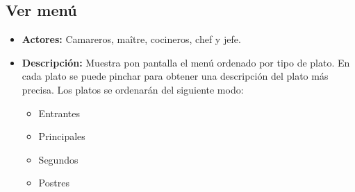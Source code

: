 \documentclass[spanish,a4paper,12pt]{report}	%
\begin{document}
 	
	\subsection{Ver menú}
			\begin{itemize}
			\item \textbf{Actores:} Camareros, maître, cocineros, chef y jefe.
			\item \textbf{Descripción:} Muestra pon pantalla el menú ordenado por tipo de plato. En cada plato se puede pinchar para obtener una descripción del plato más precisa. Los platos se ordenarán del siguiente modo:
			\begin{itemize}
				\item 	 Entrantes
				\item 	 Principales
				\item 	 Segundos
				\item 	 Postres
				\end {itemize}
		\end {itemize}

	\newpage
	\hspace{0.5 true cm}	
\end{document}
